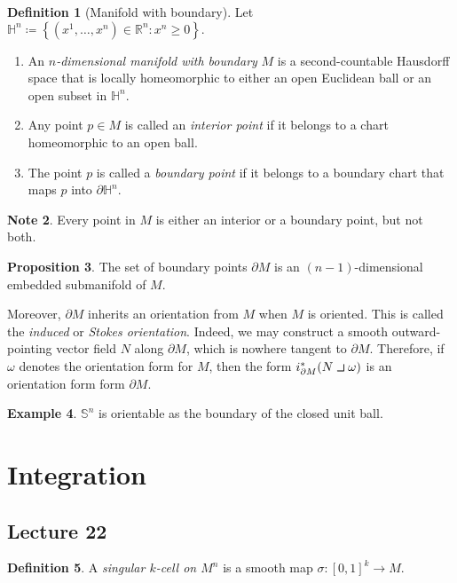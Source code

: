 \documentclass[10pt,letterpaper,cm]{nupset}
\theoremstyle{definition}
\newtheorem{definition}{Definition}[subsection]
\newtheorem{exmp}[definition]{Example}
\newtheorem{note}[definition]{Note}
\theoremstyle{theorem}
\newtheorem{prop}[definition]{Proposition}
\theoremstyle{remark}
\renewcommand{\H}{\mathbb H}
\newcommand{\R}{\mathbb R}
\renewcommand{\S}{\mathbb S}
\newcommand{\1}{\mathbf{1}}
\newcommand{\0}{\vec 0}
\newcommand{\intprodl}{%
    \mathbin{\scalebox{1.5}{$\lrcorner$}}%
}
\begin{document}
\begin{definition}[Manifold with boundary]
Let $\H^n\coloneqq  \left\{(x^1, \ldots, x^n) \in \R^n : x^n \geq 0\right\}.$ 
\begin{enumerate}
\item An \textit{$n$-dimensional manifold with boundary} $M$ is a second-countable Hausdorff space that is locally homeomorphic to either an open Euclidean ball or an open subset in $\H^n$. 
\item Any point $p\in M$ is called an \textit{interior point} if it belongs to a chart homeomorphic to an open ball. 
\item The  point $p$ is called a \textit{boundary point} if it belongs to a boundary chart that maps $p$ into $\partial{\H^n}$.
\end{enumerate}
\end{definition}

\begin{note}
Every point in $M$ is either an interior or a boundary point, but not both.
\end{note}

\begin{prop}
The set of boundary points $\partial{M}$ is an $(n-1)$-dimensional embedded submanifold of $M$.
\end{prop}


Moreover, $\partial{M}$ inherits an orientation from $M$ when $M$ is oriented. This is called the \textit{induced} or \textit{Stokes orientation}. Indeed, we may construct a smooth  outward-pointing vector field $N$ along $\partial{M}$, which is nowhere tangent to $\partial{M}$. Therefore,  if $\omega$ denotes the orientation form for $M$, then the form $i^{\ast}_{\partial{M}}(N \intprodl \omega)$ is an orientation form form $\partial{M}$.


\begin{exmp}
$\S^n$ is orientable as the boundary of the closed unit ball.
\end{exmp}

\section{Integration}

\subsection{Lecture 22}

\begin{definition}
A \textit{singular $k$-cell on $M^n$} is a smooth map $\sigma : [0,1]^k \to M$.
\end{definition}
\end{document}
